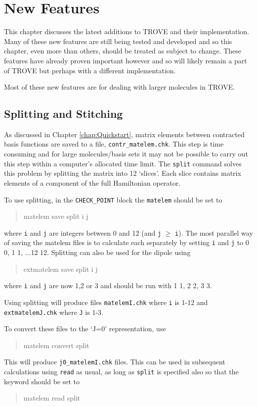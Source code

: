 
\chapter{New Features}
\label{chap:newfeat}

This chapter discusses the latest additions to TROVE and their implementation. Many of these new features are still being 
tested and developed and so this chapter, even more than others, should be treated as subject to change. These features
have already proven important however and so will likely remain a part of TROVE but perhaps with a different implementation.

Most of these new features are for dealing with larger molecules in TROVE.




\section{Splitting and Stitching}

As discussed in Chapter \ref{chap:Quickstart}, matrix elements between contracted basis functions are saved to a file,
\verb|contr_matelem.chk|. This step is time consuming and for large molecules/basis sets it may not be possible to carry out
this step within a computer's allocated time limit. The \verb|split| command solves this problem by splitting the matrix 
into 12 `slices'. Each slice contains matrix elements of a component of the full Hamiltonian operator.

To use splitting, in the \verb|CHECK_POINT| block the \verb|matelem| should be set to
\begin{verse}
matelem  save  split i j 
\end{verse}
where \verb|i| and \verb|j| are integers between 0 and 12 (and \verb|j| $\geq$ \verb|i|). The most parallel way of saving 
the matelem files is to calculate each separately by setting \verb|i| and \verb|j| to 0 0, 1 1, ...12 12. Splitting can
also be used for the dipole using
\begin{verse}
extmatelem  save  split i j 
\end{verse}
where \verb|i| and \verb|j| are now 1,2 or 3 and should be run with 1 1, 2 2, 3 3.

Using splitting will produce files \verb|matelemI.chk| where \verb|i| is 1-12 and \verb|extmatelemJ.chk| where \verb|J| 
is 1-3. 

To convert these files to the `J=0' representation, use
\begin{verse}
matelem  convert  split 
\end{verse}
This will produce \verb|j0_matelemI.chk| files. This can be used in subsequent calculations using \verb|read| as usual,
as long as \verb|split| is specified also so that the keyword should be set to
\begin{verse}
matelem  read  split 
\end{verse}

